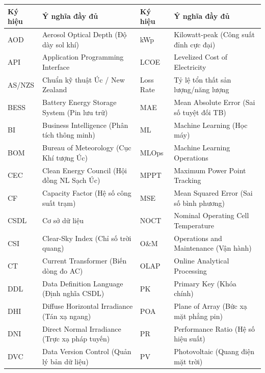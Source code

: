 \documentclass[12pt, a4paper]{report}
\begin{document}
\begin{table}[H]
\centering
\scriptsize
\renewcommand{\arraystretch}{1.15}
\begin{tabularx}{\textwidth}{@{} l >{\raggedright\arraybackslash}X @{\hspace{10pt}} l >{\raggedright\arraybackslash}X @{}}
\toprule
\textbf{Ký hiệu} & \textbf{Ý nghĩa đầy đủ} & \textbf{Ký hiệu} & \textbf{Ý nghĩa đầy đủ} \\
\midrule
AOD       & Aerosol Optical Depth (Độ dày sol khí)     & kWp       & Kilowatt-peak (Công suất đỉnh cực đại) \\
API       & Application Programming Interface         & LCOE      & Levelized Cost of Electricity \\
AS/NZS    & Chuẩn kỹ thuật Úc / New Zealand            & Loss Rate & Tỷ lệ tổn thất sản lượng/năng lượng \\
BESS      & Battery Energy Storage System (Pin lưu trữ)& MAE       & Mean Absolute Error (Sai số tuyệt đối TB) \\
BI        & Business Intelligence (Phân tích thông minh)& ML       & Machine Learning (Học máy) \\
BOM       & Bureau of Meteorology (Cục Khí tượng Úc)   & MLOps     & Machine Learning Operations \\
CEC       & Clean Energy Council (Hội đồng NL Sạch Úc) & MPPT      & Maximum Power Point Tracking \\
CF        & Capacity Factor (Hệ số công suất trạm)     & MSE       & Mean Squared Error (Sai số bình phương) \\
CSDL      & Cơ sở dữ liệu                              & NOCT      & Nominal Operating Cell Temperature \\
CSI       & Clear-Sky Index (Chỉ số trời quang)        & O\&M      & Operations and Maintenance (Vận hành) \\
CT        & Current Transformer (Biến dòng đo AC)      & OLAP      & Online Analytical Processing \\
DDL       & Data Definition Language (Định nghĩa CSDL) & PK        & Primary Key (Khóa chính) \\
DHI       & Diffuse Horizontal Irradiance (Tán xạ ngang)& POA      & Plane of Array (Bức xạ mặt phẳng pin) \\
DNI       & Direct Normal Irradiance (Trực xạ pháp tuyến)& PR       & Performance Ratio (Hệ số hiệu suất) \\
DVC       & Data Version Control (Quản lý bản dữ liệu) & PV        & Photovoltaic (Quang điện mặt trời) \\

\end{tabularx}
\end{table}
\end{document}
